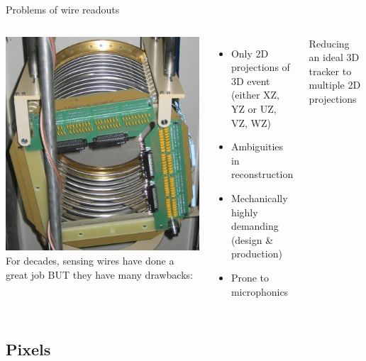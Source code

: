 \documentclass[]{beamer}
\newcommand*{\emphcol}{blue}
\begin{document}
\begin{frame}{Problems of wire readouts}
	\begin{columns}[c]
		\centering
		\includegraphics[width=\textwidth]{defence/mat_wires}
		For decades, sensing wires have done a great job
		BUT they have many drawbacks:
		\begin{itemize}
			\item Only 2D projections of 3D event (either XZ, YZ or UZ, VZ, WZ)
			\item Ambiguities in reconstruction
			\item Mechanically highly demanding (design \& production)
			\item Prone to microphonics
		\end{itemize}
		{\color{\emphcol} Reducing an ideal 3D tracker to multiple 2D projections}
	\end{columns}
\end{frame}

\subsection{Pixels}
\end{document}
